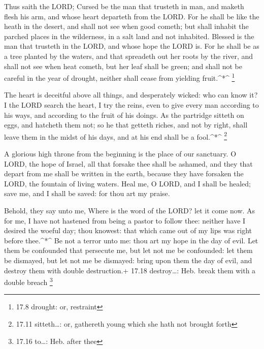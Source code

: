  Thus saith the LORD; Cursed be the man that trusteth in
man, and maketh flesh his arm, and whose heart departeth from the LORD.
 For he shall be like the heath in the desert, and shall not
see when good cometh; but shall inhabit the parched places in the
wilderness, in a salt land and not inhabited.  Blessed is
the man that trusteth in the LORD, and whose hope the LORD is.
 For he shall be as a tree planted by the waters, and that
spreadeth out her roots by the river, and shall not see when heat
cometh, but her leaf shall be green; and shall not be careful in the
year of drought, neither shall cease from yielding fruit.\^{}*\^{}
\footnote{17.8 drought: or, restraint}

 The heart is deceitful above all things, and desperately
wicked: who can know it?  I the LORD search the heart, I
try the reins, even to give every man according to his ways, and
according to the fruit of his doings.  As the partridge
sitteth on eggs, and hatcheth them not; so he that getteth riches, and
not by right, shall leave them in the midst of his days, and at his end
shall be a fool.\^{}*\^{} \footnote{17.11 sitteth\ldots: or, gathereth
  young which she hath not brought forth}

 A glorious high throne from the beginning is the place of
our sanctuary.  O LORD, the hope of Israel, all that
forsake thee shall be ashamed, and they that depart from me shall be
written in the earth, because they have forsaken the LORD, the fountain
of living waters.  Heal me, O LORD, and I shall be healed;
save me, and I shall be saved: for thou art my praise.

 Behold, they say unto me, Where is the word of the LORD?
let it come now.  As for me, I have not hastened from being
a pastor to follow thee: neither have I desired the woeful day; thou
knowest: that which came out of my lips was right before thee.\^{}*\^{}
 Be not a terror unto me: thou art my hope in the day of
evil.  Let them be confounded that persecute me, but let
not me be confounded: let them be dismayed, but let not me be dismayed:
bring upon them the day of evil, and destroy them with double
destruction.+ 17.18 destroy\ldots: Heb. break them with a double breach
\footnote{17.16 to\ldots: Heb. after thee}

